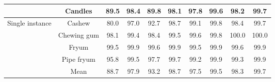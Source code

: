 \documentclass[runningheads]{llncs}
\begin{document}
\begin{table*}[!ht]
{\begin{tabular}{cc|cccc|cccc}
    \multicolumn{1}{c|}{}                                    & Candles     & 89.5  & 98.4                        & 89.8        & 98.1        & 97.8  & 99.6                        & 98.2       & 99.7        \\ \hline
    \multicolumn{1}{c|}{\multirow{4}{*}{Single instance}}    & Cashew      & 80.0  & 97.0                        & 92.7        & 98.7        & 99.1  & 99.8                        & 98.4       & 99.7        \\
    \multicolumn{1}{c|}{}                                    & Chewing gum & 98.1  & 99.4                        & 98.4        & 99.5        & 99.6  & 99.8                        & 100.0      & 100.0       \\
    \multicolumn{1}{c|}{}                                    & Fryum       & 99.5  & 99.9                        & 99.6        & 99.9        & 99.5  & 99.9                        & 99.6       & 99.9        \\
    \multicolumn{1}{c|}{}                                    & Pipe fryum  & 95.8  & 99.5                        & 97.7        & 99.7        & 99.2  & 99.9                        & 99.3       & 99.9        \\ \hline
    \multicolumn{1}{c|}{}                                    & Mean        &  88.7 & 97.9 & 93.2 & 98.7 & 97.5 & 99.5 & 98.3 & 99.7         \\ \hline
    \end{tabular}}
\end{table*}
\end{document}
